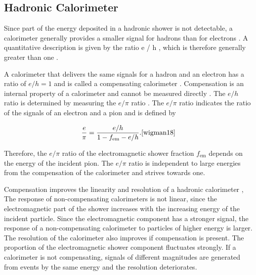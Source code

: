 \documentclass[12pt, a4paper]{thesis}
\begin{document}
\subsection{Hadronic Calorimeter}
\label{sec:orgd771604}

Since part of the energy deposited in a hadronic shower is not
detectable, a calorimeter generally provides a smaller signal for
hadrons than for electrons \cite{fabjan03}. A quantitative description
is given by the ratio e / h , which is therefore generally greater
than one \cite{wigman18}.

A calorimeter that delivers the same signals for a hadron and an
electron has a ratio of \(e / h = 1\) and is called a compensating
calorimeter \cite{wigman18}. Compensation is an internal property of a
calorimeter \cite{kolanoski16} and cannot be measured directly
\cite{wigman18}. The \(e / h\) ratio is determined by measuring the
\(e / \pi\) ratio \cite{wigman18}. The \(e / \pi\) ratio indicates the
ratio of the signals of an electron and a pion and is defined by

\begin{align}
  \frac{e}{\pi}=\frac{e/h}{1-f_{\text{em}} - e/h}. \cite{wigman18}
\end{align}

Therefore, the \(e / \pi\) ratio of the electromagnetic shower fraction
\(f_{\text{em}}\) depends on the energy of the incident pion. The \(e / \pi\) ratio
is independent to large energies from the compensation of the calorimeter and
strives towards one.

Compensation improves the linearity and resolution of a hadronic calorimeter
\cite{wigman18,kolanoski16,fabjan03}, The response of non-compensating
calorimeters is not linear, since the electromagnetic part of the shower
increases with the increasing energy of the incident particle. Since the
electromagnetic component has a stronger signal, the response of a
non-compensating calorimeter to particles of higher energy is larger. The
resolution of the calorimeter also improves if compensation is present. The
proportion of the electromagnetic shower component fluctuates strongly. If a
calorimeter is not compensating, signals of different magnitudes are generated
from events by the same energy and the resolution deteriorates.
\end{document}
